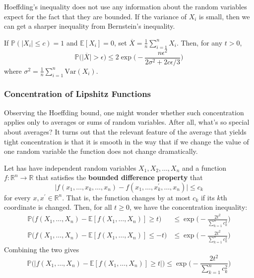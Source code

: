 \documentclass{article}
\begin{document}
      Hoeffding's inequality does not use any information about the random variables expect for the fact that they are bounded. If the variance of $X_i$ is small, then we can get a sharper inequality from Bernstein's inequality. 

      \begin{theorem}
        If $\mathbb{P}(|X_i| \leq c) = 1$ and $\mathbb{E}[X_i] = 0$, set $\overline{X} = \frac{1}{n} \sum_{i=1}^n X_i$. Then, for any $t > 0$, 
        \begin{equation}
          \mathbb{P} \big( \big| \overline{X} \big| > \epsilon \big) \leq 2 \exp \bigg( - \frac{n \epsilon^2}{2 \sigma^2 + 2 c \epsilon /3} \bigg)
        \end{equation}
        where $\sigma^2 = \frac{1}{n} \sum_{i=1}^n \mathrm{Var}(X_i)$. 
      \end{theorem}

    \subsubsection{Concentration of Lipshitz Functions}

      Observing the Hoeffding bound, one might wonder whether such concentration applies only to averages or sums of random variables. After all, what's so special about averages? It turns out that the relevant feature of the average that yields tight concentration is that it is smooth in the way that if we change the value of one random variable the function does not change dramatically. 

      \begin{theorem}
        Let has have independent random variables $X_1, X_2, \ldots, X_n$ and a function $f: \mathbb{R}^n \longrightarrow \mathbb{R}$ that satisfies the \textbf{bounded difference property} that 
        \begin{equation}
          \big| f(x_1, \ldots, x_k, \ldots, x_n) - f(x_1, \ldots, x_k^\prime, \ldots, x_n) \big| \leq c_k
        \end{equation}
        for every $x, x^\prime \in \mathbb{R}^n$. That is, the function changes by at most $c_k$ if its $k$th coordinate is changed. Then, for all $t \geq 0$, we have the concentration inequality: 
        \begin{align*}
          \mathbb{P} \big( f(X_1, \ldots, X_n) - \mathbb{E}[ f(X_1, \ldots, X_n)] \geq t \big) & \leq \exp \bigg(- \frac{2t^2}{\sum_{k=1}^n c_k^2} \bigg) \\
          \mathbb{P} \big( f(X_1, \ldots, X_n) - \mathbb{E}[ f(X_1, \ldots, X_n)] \leq -t \big) & \leq \exp \bigg(- \frac{2t^2}{\sum_{k=1}^n c_k^2} \bigg)
        \end{align*}
        Combining the two gives 
        \[\mathbb{P} \big( \big| f(X_1, \ldots, X_n) - \mathbb{E}[ f(X_1, \ldots, X_n)] \geq t \big| \big) \leq \exp \bigg(- \frac{2t^2}{\sum_{k=1}^n c_k^2} \bigg)\]
      \end{theorem}
\end{document}
